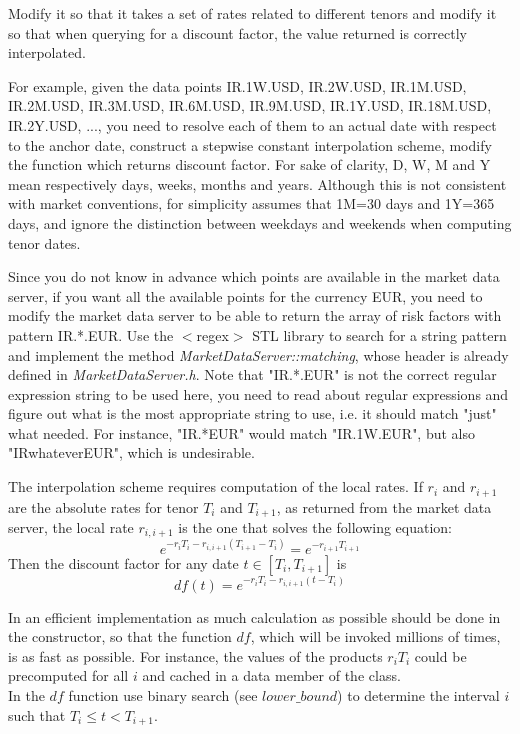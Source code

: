 \documentclass[10pt]{article}
\begin{document}
Modify it so that it takes a set of rates related to different tenors and modify it so that when querying for a discount factor, the value returned is correctly interpolated.

For example, given the data points {IR.1W.USD, IR.2W.USD, IR.1M.USD, IR.2M.USD, IR.3M.USD, IR.6M.USD, IR.9M.USD, IR.1Y.USD, IR.18M.USD, IR.2Y.USD, ...}, you need to resolve each of them to an actual date with respect to the anchor date, construct a stepwise constant interpolation scheme, modify the function which returns discount factor. For sake of clarity, D, W, M and Y mean respectively days, weeks, months and years. Although this is not consistent with market conventions, for simplicity assumes that 1M=30 days and 1Y=365 days, and ignore the distinction between weekdays and weekends when computing tenor dates.

Since you do not know in advance which points are available in the market data server, if you want all the available points for the currency EUR, you need to modify the market data server to be able to return the array of risk factors with pattern IR.*.EUR. Use the $<$regex$>$ STL library to search for a string pattern and implement the method \textit{MarketDataServer::matching}, whose header is already defined in \textit{MarketDataServer.h}. Note that "IR.*.EUR" is not the correct regular expression string to be used here, you need to read about regular expressions and figure out what is the most appropriate string to use, i.e. it should match "just" what needed. For instance, "IR.*EUR" would match "IR.1W.EUR", but also "IRwhateverEUR", which is undesirable.

The interpolation scheme requires computation of the local rates. If $r_i$ and $r_{i+1}$ are the absolute rates for tenor $T_i$ and $T_{i+1}$, as returned from the market data server, the local rate $r_{i,i+1}$ is the one that solves the following equation:
$$e^{-r_iT_i-r_{i,i+1}(T_{i+1}-T_i)}=e^{-r_{i+1}T_{i+1}}$$
Then the discount factor for any date $t \in [T_i,T_{i+1}]$ is $$df(t)=e^{-r_i T_i-r_{i,i+1}(t-T_i)}$$

In an efficient implementation as much calculation as possible should be done in the constructor, so that the function $df$, which will be invoked millions of times, is as fast as possible. For instance, the values of the products $r_iT_i$ could be precomputed for all $i$ and cached in a data member of the class.\\

In the $df$ function use binary search (see $lower\_bound$) to determine the interval $i$ such that $T_i \leq t < T_{i+1}$.\\
\end{document}
